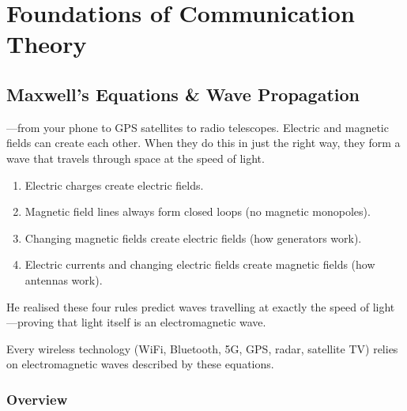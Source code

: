 
\chapter{Foundations of Communication Theory} %
\label{ch:foundations}

\section{Maxwell's Equations \& Wave Propagation}
\label{sec:maxwell}

\begin{nontechnical}
    ---from your phone to GPS satellites to radio telescopes.
     Electric and magnetic fields can create each other. When they do this in just the right way, they form a wave that travels through space at the speed of light.

    \begin{enumerate}[label=\arabic*.]
        \item Electric charges create electric fields.
        \item Magnetic field lines always form closed loops (no magnetic monopoles).
        \item Changing magnetic fields create electric fields (how generators work).
        \item Electric currents and changing electric fields create magnetic fields (how antennas work).
    \end{enumerate}

     He realised these four rules predict waves travelling at exactly the speed of light---proving that light itself is an electromagnetic wave.

     Every wireless technology (WiFi, Bluetooth, 5G, GPS, radar, satellite TV) relies on electromagnetic waves described by these equations.
\end{nontechnical}

\subsection{Overview}


